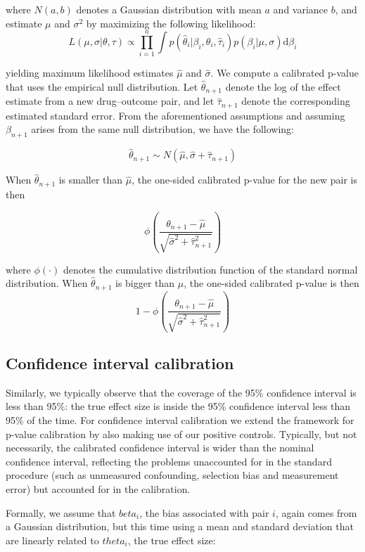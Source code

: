 \documentclass[11pt]{book}
\begin{document}
where \(N(a,b)\) denotes a Gaussian distribution with mean \(a\) and
variance \(b\), and estimate \(\mu\) and \(\sigma^2\) by maximizing the
following likelihood:
\[L(\mu, \sigma | \theta, \tau) \propto \prod_{i=1}^{n}\int p(\hat{\theta}_i|\beta_i, \theta_i, \hat{\tau}_i)p(\beta_i|\mu, \sigma) \text{d}\beta_i\]

yielding maximum likelihood estimates \(\hat{\mu}\) and
\(\hat{\sigma}\). We compute a calibrated p-value that uses the
empirical null distribution. Let \(\hat{\theta}_{n+1}\) denote the log
of the effect estimate from a new drug--outcome pair, and let
\(\hat{\tau}_{n+1}\) denote the corresponding estimated standard error.
From the aforementioned assumptions and assuming \(\beta_{n+1}\) arises
from the same null distribution, we have the following:

\[\hat{\theta}_{n+1} \sim N(\hat{\mu}, \hat{\sigma} + \hat{\tau}_{n+1})\]

When \(\hat{\theta}_{n+1}\) is smaller than \(\hat{\mu}\), the one-sided
calibrated p-value for the new pair is then

\[\phi\left(\frac{\theta_{n+1} - \hat{\mu}}{\sqrt{\hat{\sigma}^2 + \hat{\tau}_{n+1}^2}}\right)\]

where \(\phi(\cdot)\) denotes the cumulative distribution function of
the standard normal distribution. When \(\hat{\theta}_{n+1}\) is bigger
than \(\hat{\mu}\), the one-sided calibrated p-value is then
\[1-\phi\left(\frac{\theta_{n+1} - \hat{\mu}}{\sqrt{\hat{\sigma}^2 + \hat{\tau}_{n+1}^2}}\right)\]

\subsection{Confidence interval
calibration}\label{confidence-interval-calibration}

Similarly, we typically observe that the coverage of the 95\% confidence
interval is less than 95\%: the true effect size is inside the 95\%
confidence interval less than 95\% of the time. For confidence interval
calibration \citep{schuemie_2018} we extend the framework for p-value
calibration by also making use of our positive controls. Typically, but
not necessarily, the calibrated confidence interval is wider than the
nominal confidence interval, reflecting the problems unaccounted for in
the standard procedure (such as unmeasured confounding, selection bias
and measurement error) but accounted for in the calibration.

Formally, we assume that \(beta_i\), the bias associated with pair
\(i\), again comes from a Gaussian distribution, but this time using a
mean and standard deviation that are linearly related to \(theta_i\),
the true effect size:
\end{document}
